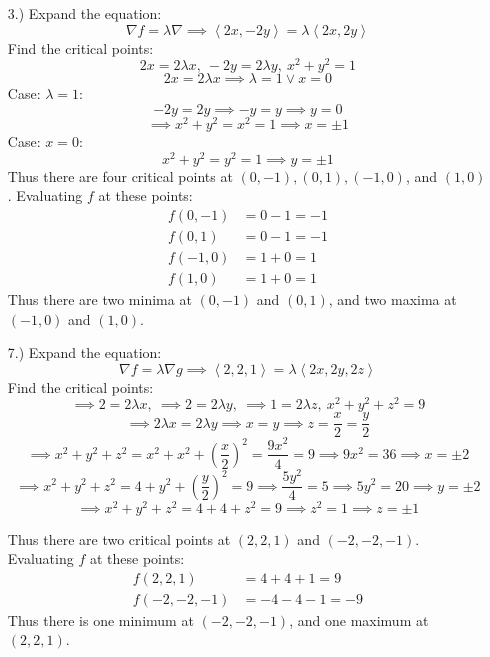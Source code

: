 \documentclass[12pt]{article}
\newcommand{\angleb}[1]{\left\langle#1\right\rangle}
\newcommand{\parns}[1]{\left(#1\right)}
\begin{document}
\begin{itemize}
    \item[3.)] Expand the equation:
    \[\nabla f=\lambda\nabla\implies \angleb{2x,-2y}=\lambda\angleb{2x,2y}\]
    Find the critical points:
    \[2x=2\lambda x,\ -2y=2\lambda y,\ x^2+y^2=1\]
    \[2x=2\lambda x\implies\lambda=1\lor x=0\]
    Case: $\lambda=1$:
    \[-2y=2y\implies -y=y\implies y=0\]
    \[\implies x^2+y^2=x^2=1\implies x=\pm1\]
    Case: $x=0$:
    \[x^2+y^2=y^2=1\implies y=\pm1\]
    Thus there are four critical points at $(0,-1),(0,1),(-1,0)$, and $(1,0)$. Evaluating $f$ at these points:
    \begin{align*}
        f(0,-1)&=0-1=-1\\
        f(0,1)&=0-1=-1\\
        f(-1,0)&=1+0=1\\
        f(1,0)&=1+0=1
    \end{align*}
    Thus there are two minima at $(0,-1)$ and $(0,1)$, and two maxima at $(-1,0)$ and $(1,0)$.

    \item[7.)] Expand the equation:
    \[\nabla f=\lambda\nabla g\implies\angleb{2,2,1}=\lambda\angleb{2x,2y,2z}\]
    Find the critical points:
    \[\implies 2=2\lambda x,\ \implies 2=2\lambda y,\ \implies 1=2\lambda z,\ x^2+y^2+z^2=9\]
    \[\implies 2\lambda x=2\lambda y\implies x=y\implies z=\frac{x}{2}=\frac{y}{2}\]
    \[\implies x^2+y^2+z^2=x^2+x^2+\parns{\frac{x}{2}}^2=\frac{9x^2}{4}=9\implies 9x^2=36\implies x=\pm2\]
    \[\implies x^2+y^2+z^2=4+y^2+\parns{\frac{y}{2}}^2=9\implies\frac{5y^2}{4}=5\implies 5y^2=20\implies y=\pm2\]
    \[\implies x^2+y^2+z^2=4+4+z^2=9\implies z^2=1\implies z=\pm1\]

    Thus there are two critical points at $(2,2,1)$ and $(-2,-2,-1)$. Evaluating $f$ at these points:
    \begin{align*}
        f(2,2,1)&=4+4+1=9\\
        f(-2,-2,-1)&=-4-4-1=-9
    \end{align*}
    Thus there is one minimum at $(-2,-2,-1)$, and one maximum at $(2,2,1)$.


\end{itemize}
\end{document}
